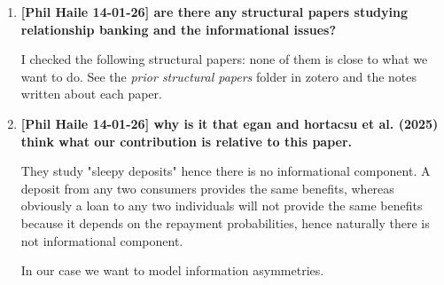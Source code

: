\documentclass[12pt]{article}
\theoremstyle{plain}
\theoremstyle{plain}
\theoremstyle{definition}  %
\theoremstyle{remark}  %
\begin{document}
\begin{enumerate}
\begin{itemize}
        \item \textcite{degryse_relationship_2000} test for the possibility of rent shifting by banks. The evidence shows two opposing effects. On the one hand, the loan rate increases with the duration of a bank–firm relationship. On the other hand, the scope of a relationship, defined as the purchase of other information-sensitive products from a bank, decreases the loan's interest rate substantially. Relationship duration and scope thus have opposite effects on loan rates, with the latter being more important.

    \end{itemize}

    \textcite{boot_relationship_2000} reviews the literature and determines that banks have private info \footnote{Some statements "The banks’ assets are illiquid largely because of their information sensitivity. In originating and pricing loans, banks develop proprietary information. " and then " informational frictions—asymmetric (and proprietary) information—provide the most fundamental explanation for the existence of (financial) intermediaries. "}

    




    
    \item \textbf{[Phil Haile 14-01-26] are there any structural papers studying relationship banking and the informational issues?}

    I checked the following structural papers: \textcite{bird_value_2020,buchak_beyond_2024,dempsey_quantitative_2025,kim_estimating_2003,schwert_bank_2018,truffa_estimating_2025,wang_bank_2022} none of them is close to what we want to do. See the \textit{prior structural papers} folder in zotero and the notes written about each paper. 
    
    
    \item \textbf{[Phil Haile 14-01-26] why is it that egan and hortacsu et al. (2025) think what our    contribution is relative to this paper.}

    They study "sleepy deposits" hence there is no informational component. A deposit from any two consumers provides the same benefits, whereas obviously a loan to any two individuals will not provide the same benefits because it depends on the repayment probabilities, hence naturally there is not informational component. 

    In our case we want to model information asymmetries. 
    

\end{enumerate}
\end{document}
